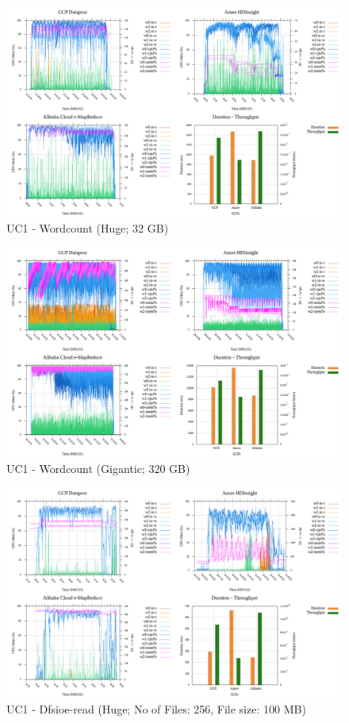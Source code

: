 \documentclass[review]{elsarticle}
\begin{document}
\begin{figure}[p]
	\caption{UC1 - Wordcount (Huge; 32 GB)}
	\label{fig:uc1-wrdcnt-h-cmidt}
	\includegraphics[width=\textwidth]{uc1-wrdcnt-h-cmidt}
	\centering
\end{figure}

\begin{figure}[p]
	\caption{UC1 - Wordcount (Gigantic; 320 GB)}
	\label{fig:uc1-wrdcnt-g-cmidt}
	\includegraphics[width=\textwidth]{uc1-wrdcnt-g-cmidt}
	\centering
\end{figure}

\begin{figure}[p]
	\caption{UC1 - Dfsioe-read (Huge; No of Files: 256, File size: 100 MB)}
	\label{fig:uc1-dfsioer-h-cmidt}
	\includegraphics[width=\textwidth]{uc1-dfsioer-h-cmidt}
	\centering
\end{figure}
\end{document}

